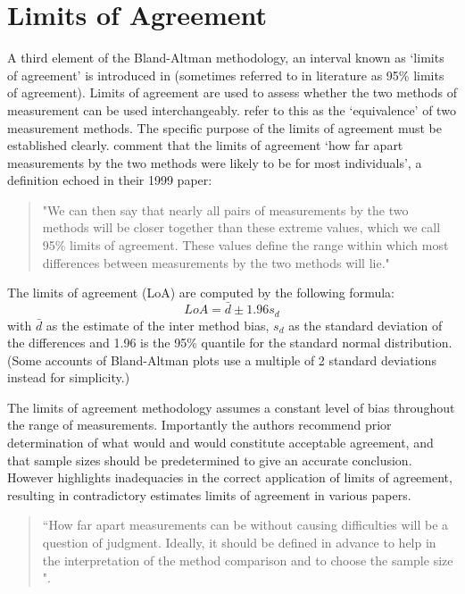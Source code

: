 \section{Limits of Agreement}
A third element of the Bland-Altman methodology, an interval known
as `limits of agreement' is introduced in \citet*{BA86}
(sometimes referred to in literature as 95\% limits of agreement).
Limits of agreement are used to assess whether the two methods of
measurement can be used interchangeably. \citet{BA86} refer to
this as the `equivalence' of two measurement methods. The specific purpose of the limits of
agreement must be
established clearly. \citet*{BA95} comment that the limits of agreement `how
far apart measurements by the two methods were likely to be for
most individuals', a definition echoed in their 1999 paper:

\begin{quote}"We can then say that nearly all pairs
of measurements by the two methods will be closer together than
these extreme values, which we call 95\% limits of agreement.
These values define the range within which most differences
between measurements by the two methods will lie."
\end{quote}

The limits of agreement (LoA) are computed by the following
formula:
\[
LoA = \bar{d} \pm 1.96 s_{d}
\]
with $\bar{d}$ as the estimate of the inter method bias, $s_{d}$
as the standard deviation of the differences and 1.96 is the 95\%
quantile for the standard normal distribution. (Some accounts of
Bland-Altman plots use a multiple of 2 standard deviations instead
for simplicity.)

The limits of agreement methodology assumes a constant level of bias throughout the range of measurements. Importantly the authors recommend prior determination of what would and would constitute acceptable
agreement, and that sample sizes should be predetermined to give an accurate conclusion. However \citet{mantha} highlights inadequacies in the correct application of limits of agreement, resulting in contradictory estimates limits of agreement in various papers.

\begin{quote}
``How far apart measurements can be without causing difficulties
will be a question of judgment. Ideally, it should be defined in
advance to help in the interpretation of the method comparison and
to choose the sample size \citep{BA86}".
\end{quote}


